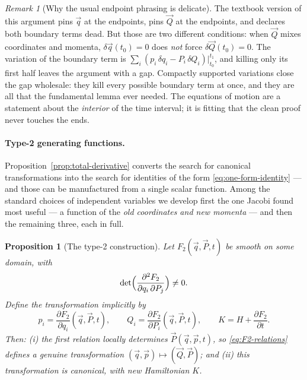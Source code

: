 \documentclass[11pt]{article}
\theoremstyle{plain}
\newtheorem{proposition}[theorem]{Proposition}
\theoremstyle{definition}
\theoremstyle{remark}
\newtheorem{remark}[theorem]{Remark}
\newcommand{\pd}[2]{\frac{\partial #1}{\partial #2}}
\newcommand{\vq}{\vec{q}}
\newcommand{\vp}{\vec{p}}
\newcommand{\vQ}{\vec{Q}}
\newcommand{\vP}{\vec{P}}
\begin{document}
\begin{remark}[Why the usual endpoint phrasing is delicate]
The textbook version of this argument pins $\vq$ at the endpoints,
pins $\vQ$ at the endpoints, and declares both boundary terms dead. But
those are two different conditions: when $\vQ$ mixes coordinates and
momenta, $\delta\vq(t_0) = 0$ does \emph{not} force
$\delta\vQ(t_0) = 0$. The variation of the boundary term is
$\sum_i(p_i\,\delta q_i - P_i\,\delta Q_i)\big|_{t_0}^{t_1}$, and
killing only its first half leaves the argument with a gap. Compactly
supported variations close the gap wholesale: they kill every possible
boundary term at once, and they are all that the fundamental lemma ever
needed. The equations of motion are a statement about the
\emph{interior} of the time interval; it is fitting that the clean
proof never touches the ends.
\end{remark}

\paragraph{Type-2 generating functions.}
Proposition~\ref{prop:total-derivative} converts the search for
canonical transformations into the search for identities of the form
\eqref{eq:one-form-identity} --- and those can be manufactured from a
single scalar function. Among the standard choices of independent
variables we develop first the one Jacobi found most useful --- a
function of the \emph{old coordinates and new momenta} --- and then
the remaining three, each in full.

\begin{proposition}[The type-2 construction]
\label{prop:F2}
Let $F_2(\vq, \vP, t)$ be smooth on some domain, with
\begin{equation}
  \det\Bigl(\frac{\partial^2 F_2}{\partial q_i\,\partial P_j}\Bigr)
  \ne 0 .
  \label{eq:F2-nondegeneracy}
\end{equation}
Define the transformation implicitly by
\begin{equation}
  p_i = \pd{F_2}{q_i}(\vq, \vP, t),
  \qquad
  Q_i = \pd{F_2}{P_i}(\vq, \vP, t),
  \qquad
  K = H + \pd{F_2}{t} .
  \label{eq:F2-relations}
\end{equation}
Then: (i) the first relation locally determines $\vP(\vq, \vp, t)$,
so \eqref{eq:F2-relations} defines a genuine transformation
$(\vq,\vp) \mapsto (\vQ,\vP)$; and (ii) this transformation is
canonical, with new Hamiltonian $K$.
\end{proposition}
\end{document}
